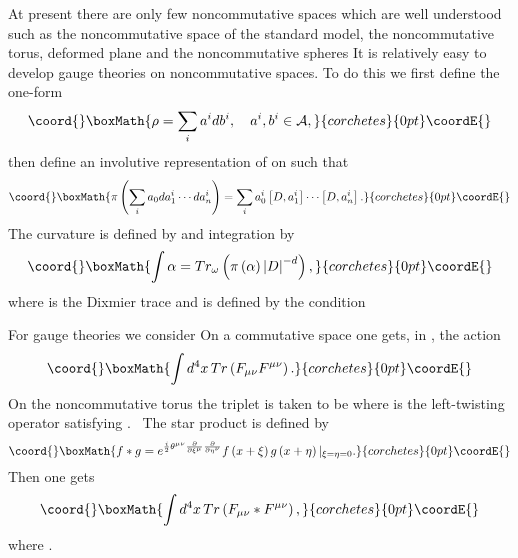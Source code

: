 \documentclass[a4paper,12pt]{article}
\begin{document}
At present there are only few noncommutative spaces which are well understood
such as the noncommutative space of the standard model, the noncommutative
torus, deformed plane \coordHE{} and the noncommutative spheres \coordHE{}  \coordHE{}  \coordHE{} It is relatively easy to develop gauge theories on
noncommutative spaces. To do this we first define the one-form
\[\coord{}\boxMath{
\rho=\sum_{i}a^{i}db^{i},\quad a^{i},b^{i}\in\mathcal{A},
}{corchetes}{0pt}\coordE{}\]
then define an involutive representation \myHighlight{$\pi$}\coordHE{} of \coordHE{} on \coordHE{} such
that
\[\coord{}\boxMath{
\pi\left(  \sum\limits_{i}a_{0}da_{1}^{i}\cdots da_{n}^{i}\right)
=\sum\limits_{i}a_{0}^{i}\left[  D,a_{1}^{i}\right]  \cdots\left[  D,a_{n}%
^{i}\right]  .
}{corchetes}{0pt}\coordE{}\]
The curvature is defined by \coordHE{} and integration by
\[\coord{}\boxMath{
\int\alpha=Tr_{\omega}\left(  \pi\left(  \alpha\right)  \left|  D\right|
^{-d}\right)  ,
}{corchetes}{0pt}\coordE{}\]
where \coordHE{} is the Dixmier trace and \coordHE{} is defined by the condition
\coordHE{}  \myHighlight{$\forall$}\coordHE{}  \coordHE{}

For gauge theories we consider \coordHE{} On a commutative space one
gets, in \coordHE{}, the action
\[\coord{}\boxMath{
\int d^{4}x\,Tr\left(  F_{\mu\nu}F^{\mu\nu}\right)  .
}{corchetes}{0pt}\coordE{}\]
On the noncommutative torus \cite{AC3}  the triplet is taken to be  \coordHE{} where \coordHE{}
is the left-twisting operator satisfying  \coordHE{} \cite{Landi}.
\ The star product is defined by
\[\coord{}\boxMath{
f\ast g=e^{\frac{i}{2}\theta^{\mu\nu}\frac{\partial}{\partial\xi^{\mu}}%
\frac{\partial}{\partial\eta^{\nu}}}f\left(  x+\xi\right)  g\left(
x+\eta\right)  |_{\xi=\eta=0}.
}{corchetes}{0pt}\coordE{}\]
Then one gets \cite{SW}
\[\coord{}\boxMath{
\int d^{4}x\,Tr\left(  F_{\mu\nu}\ast F^{\mu\nu}\right)  ,
}{corchetes}{0pt}\coordE{}\]
where \coordHE{}.
\end{document}
